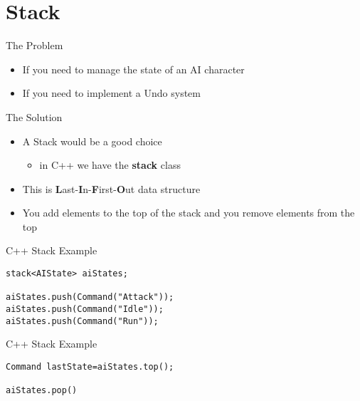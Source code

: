 \part{Stack}
\frame{\partpage}

\begin{frame}{The Problem}
	\begin{itemize}
		\pause \item If you need to manage the state of an AI character
		\pause \item If you need to implement a Undo system   
	\end{itemize}
\end{frame}

\begin{frame}{The Solution}
	\begin{itemize}
	\pause \item A Stack would be a good choice
	\begin{itemize}
		\pause \item in C++ we have the \textbf{stack} class
	\end{itemize}
	\pause \item This is \textbf{L}ast-\textbf{I}n-\textbf{F}irst-\textbf{O}ut data structure
	\pause \item You add elements to the top of the stack and you remove elements from the top
\end{itemize}
\end{frame}


\begin{frame}[fragile]{C++ Stack
Example}
\begin{lstlisting}
stack<AIState> aiStates;

aiStates.push(Command("Attack"));
aiStates.push(Command("Idle"));
aiStates.push(Command("Run"));
\end{lstlisting}
\end{frame}

\begin{frame}[fragile]{C++ Stack
	Example}
\begin{lstlisting}
Command lastState=aiStates.top();

aiStates.pop()
\end{lstlisting}
\end{frame}